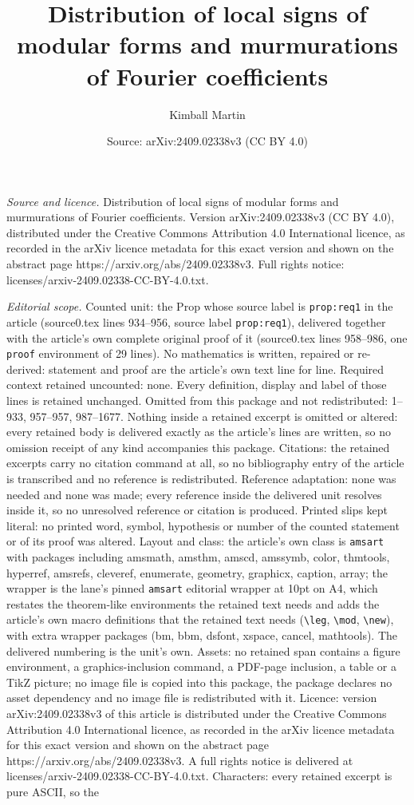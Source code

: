 \documentclass[10pt,a4paper]{amsart}
\title[Distribution of local signs of modular forms and murmuration]{Distribution of local signs of modular forms and murmurations of Fourier coefficients}
\author{Kimball Martin}
\date{Source: arXiv:2409.02338v3 (CC BY 4.0)}
\begin{document}
\maketitle

\noindent\emph{Source and licence.} Distribution of local signs of modular forms and murmurations of Fourier coefficients. Version arXiv:2409.02338v3 (CC BY 4.0), distributed under the Creative Commons Attribution 4.0 International licence, as recorded in the arXiv licence metadata for this exact version and shown on the abstract page https://arxiv.org/abs/2409.02338v3. Full rights notice: licenses/arxiv-2409.02338-CC-BY-4.0.txt.\par\smallskip

\noindent\textit{Editorial scope.} Counted unit: the Prop whose source label is \texttt{prop:req1} in the article (source0.tex lines 934--956, source label \texttt{prop:req1}), delivered together with the article's own complete original proof of it (source0.tex lines 958--986, one \texttt{proof} environment of 29 lines). No mathematics is written, repaired or re-derived: statement and proof are the article's own text line for line. Required context retained uncounted: none. Every definition, display and label of those lines is retained unchanged. Omitted from this package and not redistributed: 1--933, 957--957, 987--1677. Nothing inside a retained excerpt is omitted or altered: every retained body is delivered exactly as the article's lines are written, so no omission receipt of any kind accompanies this package. Citations: the retained excerpts carry no citation command at all, so no bibliography entry of the article is transcribed and no reference is redistributed. Reference adaptation: none was needed and none was made; every reference inside the delivered unit resolves inside it, so no unresolved reference or citation is produced. Printed slips kept literal: no printed word, symbol, hypothesis or number of the counted statement or of its proof was altered. Layout and class: the article's own class is \texttt{amsart} with packages including amsmath, amsthm, amscd, amssymb, color, thmtools, hyperref, amsrefs, cleveref, enumerate, geometry, graphicx, caption, array; the wrapper is the lane's pinned \texttt{amsart} editorial wrapper at 10pt on A4, which restates the theorem-like environments the retained text needs and adds the article's own macro definitions that the retained text needs (\texttt{\textbackslash leg}, \texttt{\textbackslash mod}, \texttt{\textbackslash new}), with extra wrapper packages (bm, bbm, dsfont, xspace, cancel, mathtools). The delivered numbering is the unit's own. Assets: no retained span contains a figure environment, a graphics-inclusion command, a PDF-page inclusion, a table or a TikZ picture; no image file is copied into this package, the package declares no asset dependency and no image file is redistributed with it. Licence: version arXiv:2409.02338v3 of this article is distributed under the Creative Commons Attribution 4.0 International licence, as recorded in the arXiv licence metadata for this exact version and shown on the abstract page https://arxiv.org/abs/2409.02338v3. A full rights notice is delivered at licenses/arxiv-2409.02338-CC-BY-4.0.txt. Characters: every retained excerpt is pure ASCII, so the 
\end{document}
